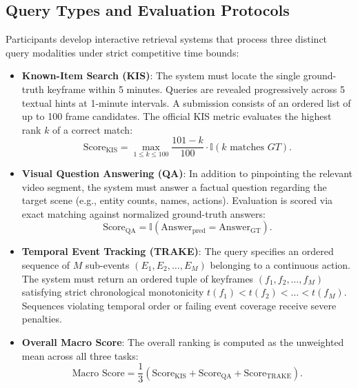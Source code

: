 \documentclass[runningheads]{llncs}
\begin{document}
\subsection{Query Types and Evaluation Protocols}
Participants develop interactive retrieval systems that process three distinct query modalities under strict competitive time bounds:
\begin{itemize}
    \item \textbf{Known-Item Search (KIS)}: The system must locate the single ground-truth keyframe within 5 minutes. Queries are revealed progressively across 5 textual hints at 1-minute intervals. A submission consists of an ordered list of up to 100 frame candidates. The official KIS metric evaluates the highest rank $k$ of a correct match:
    \begin{equation}
        \text{Score}_{\text{KIS}} = \max_{1 \le k \le 100} \frac{101 - k}{100} \cdot \mathbb{I}(k \text{ matches } GT).
    \end{equation}
    \item \textbf{Visual Question Answering (QA)}: In addition to pinpointing the relevant video segment, the system must answer a factual question regarding the target scene (e.g., entity counts, names, actions). Evaluation is scored via exact matching against normalized ground-truth answers:
    \begin{equation}
        \text{Score}_{\text{QA}} = \mathbb{I}(\text{Answer}_{\text{pred}} = \text{Answer}_{\text{GT}}).
    \end{equation}
    \item \textbf{Temporal Event Tracking (TRAKE)}: The query specifies an ordered sequence of $M$ sub-events $(E_1, E_2, \dots, E_M)$ belonging to a continuous action. The system must return an ordered tuple of keyframes $(f_1, f_2, \dots, f_M)$ satisfying strict chronological monotonicity $t(f_1) < t(f_2) < \dots < t(f_M)$. Sequences violating temporal order or failing event coverage receive severe penalties.
    \item \textbf{Overall Macro Score}: The overall ranking is computed as the unweighted mean across all three tasks:
    \begin{equation}
        \text{Macro Score} = \frac{1}{3} \left(\text{Score}_{\text{KIS}} + \text{Score}_{\text{QA}} + \text{Score}_{\text{TRAKE}}\right).
    \end{equation}
\end{itemize}

%
%
\end{document}
